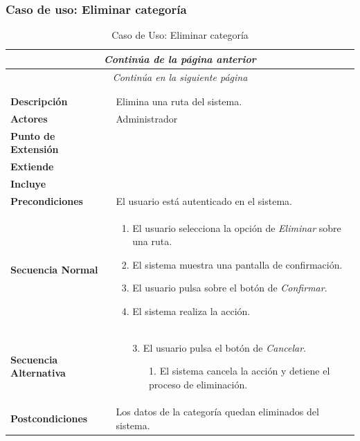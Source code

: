 \subsubsection*{Caso de uso: Eliminar categoría }
\begin{longtable}{| p{4cm} | p{10cm} |}
\endfirsthead
\multicolumn{2}{c}{\textit{Continúa de la página anterior}}\\[12pt]
\hline
\endhead
\hline
\multicolumn{2}{c}{\textit{Continúa en la siguiente página}} \\
\endfoot
\hline
\caption{Caso de Uso: Eliminar categoría}\label{fig:1}\\
\endlastfoot


\hline
\multicolumn{2}{|c|}{\textbf{CU$<$45$>$ - Eliminar Categoría}} \\

\hline
\textbf{Descripción} &
Elimina una ruta del sistema.\\

\hline
\textbf{Actores} &
Administrador\\

\hline
\textbf{Punto de Extensión} &
\\

\hline
\textbf{Extiende} &
\\

\hline
\textbf{Incluye} &
\\

\hline
\textbf{Precondiciones} &
El usuario está autenticado en el sistema.\\

\hline
\textbf{Secuencia Normal} &\mbox{}\par\vspace{-\baselineskip}
\begin{enumerate}[leftmargin=0.7cm, topsep=0.1cm]
\item El usuario selecciona la opción de \textit{Eliminar} sobre una ruta.
\item El sistema muestra una pantalla de confirmación.
\item El usuario pulsa sobre el botón de \textit{Confirmar}.
\item El sistema realiza la acción.
\end{enumerate}


\\
\hline
\textbf{Secuencia Alternativa} &\mbox{}\par\vspace{-\baselineskip}
\begin{enumerate}[leftmargin=0.9cm, topsep=0.1cm]
\item[3.] El usuario pulsa el botón de \textit{Cancelar}.
	\begin{itemize}
	\item[1.] El sistema cancela la acción y detiene el proceso de eliminación.
	\end{itemize}
\end{enumerate}
\\

\hline
\textbf{Postcondiciones} & 
Los datos de la categoría quedan eliminados del sistema.\\
\hline
\end{longtable}
